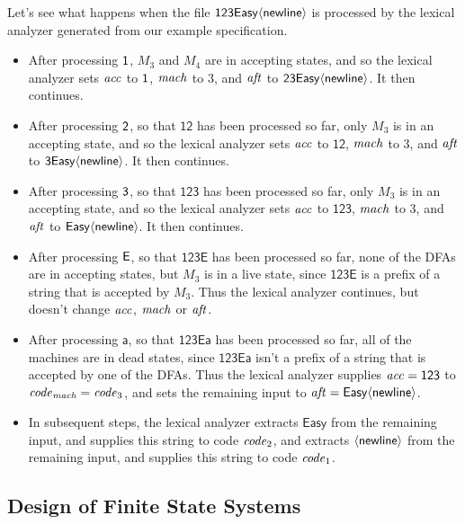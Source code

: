 Let's see what happens when the file $\mathsf{123Easy\mathsf{\langle newline\rangle}}$ is
processed by the lexical analyzer generated from our example
specification.
\begin{itemize}
\item After processing $\mathsf{1}$, $M_3$ and $M_4$ are in accepting
  states, and so the lexical analyzer sets $\mathit{acc}$ to $\mathsf{1}$, $\mathit{mach}$
  to $3$, and $\mathit{aft}$ to $\mathsf{23Easy\mathsf{\langle newline\rangle}}$.  It then
  continues.

\item After processing $\mathsf{2}$, so that $\mathsf{12}$ has been
  processed so far, only $M_3$ is in an accepting state, and so the
  lexical analyzer sets $\mathit{acc}$ to $\mathsf{12}$, $\mathit{mach}$ to $3$, and
  $\mathit{aft}$ to $\mathsf{3Easy\mathsf{\langle newline\rangle}}$.  It then continues.

\item After processing $\mathsf{3}$, so that $\mathsf{123}$ has been
  processed so far, only $M_3$ is in an accepting state, and so the
  lexical analyzer sets $\mathit{acc}$ to $\mathsf{123}$, $\mathit{mach}$ to $3$, and
  $\mathit{aft}$ to $\mathsf{Easy\mathsf{\langle newline\rangle}}$.  It then continues.

\item After processing $\mathsf{E}$, so that $\mathsf{123E}$ has been
  processed so far, none of the DFAs are in accepting states, but
  $M_3$ is in a live state, since $\mathsf{123E}$ is a prefix of a
  string that is accepted by $M_3$.  Thus the lexical analyzer
  continues, but doesn't change $\mathit{acc}$, $\mathit{mach}$ or $\mathit{aft}$.

\item After processing $\mathsf{a}$, so that $\mathsf{123Ea}$ has been
  processed so far, all of the machines are in dead states, since
  $\mathsf{123Ea}$ isn't a prefix of a string that is accepted by one
  of the DFAs.  Thus the lexical analyzer supplies $\mathit{acc}=\mathsf{123}$
  to ${\it code}_{\mathit{mach}}={\it code}_3$, and sets the remaining input to
  $\mathit{aft}=\mathsf{Easy\mathsf{\langle newline\rangle}}$.

\item In subsequent steps, the lexical analyzer extracts
  $\mathsf{Easy}$ from the remaining input, and supplies this string
  to code ${\it code}_2$, and extracts $\mathsf{\langle newline\rangle}$ from the remaining
  input, and supplies this string to code ${\it code}_1$.
\end{itemize}

\subsection{Design of Finite State Systems}

